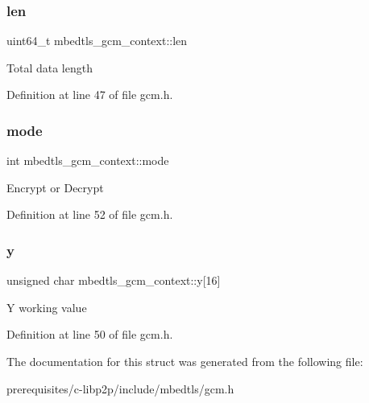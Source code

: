 \mbox{\label{structmbedtls__gcm__context_a7ca348b10a75f1ab46f7c5067c1ab6e7}} 
\subsubsection{\texorpdfstring{len}{len}}
{\footnotesize\ttfamily uint64\+\_\+t mbedtls\+\_\+gcm\+\_\+context\+::len}

Total data length 

Definition at line 47 of file gcm.\+h.

\mbox{\label{structmbedtls__gcm__context_a48f2fbbac9f7bb46411fea24ac433628}} 
\subsubsection{\texorpdfstring{mode}{mode}}
{\footnotesize\ttfamily int mbedtls\+\_\+gcm\+\_\+context\+::mode}

Encrypt or Decrypt 

Definition at line 52 of file gcm.\+h.

\mbox{\label{structmbedtls__gcm__context_a1a7eb48ed5911aeb2dd983da6cfd32bb}} 
\subsubsection{\texorpdfstring{y}{y}}
{\footnotesize\ttfamily unsigned char mbedtls\+\_\+gcm\+\_\+context\+::y\mbox{[}16\mbox{]}}

Y working value 

Definition at line 50 of file gcm.\+h.



The documentation for this struct was generated from the following file\+:\begin{DoxyCompactItemize}
\item 
prerequisites/c-\/libp2p/include/mbedtls/gcm.\+h\end{DoxyCompactItemize}
